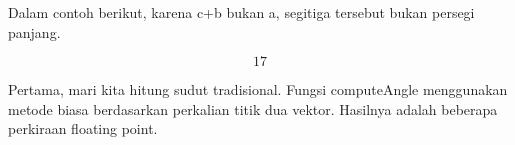 \documentclass[a4paper,10pt]{article}
\begin{document}
\begin{eulernotebook}
\begin{eulercomment}
\begin{eulercomment}
\begin{eulercomment}
\begin{eulercomment}
\begin{eulercomment}
\begin{eulercomment}
\begin{eulercomment}
\begin{eulercomment}
\begin{eulercomment}
\begin{eulercomment}
\begin{eulercomment}
\begin{eulercomment}
\begin{eulercomment}
\begin{eulercomment}
\begin{eulercomment}
\begin{eulercomment}
\begin{eulercomment}
\begin{eulercomment}
\begin{eulercomment}
Dalam contoh berikut, karena c+b bukan a, segitiga tersebut bukan
persegi panjang.
\end{eulercomment}
\begin{eulerformula}
\[
17
\]
\end{eulerformula}
\begin{eulercomment}
Pertama, mari kita hitung sudut tradisional. Fungsi computeAngle
menggunakan metode biasa berdasarkan perkalian titik dua vektor.
Hasilnya adalah beberapa perkiraan floating point.


\end{eulercomment}
\end{eulercomment}
\end{eulercomment}
\end{eulercomment}
\end{eulercomment}
\end{eulercomment}
\end{eulercomment}
\end{eulercomment}
\end{eulercomment}
\end{eulercomment}
\end{eulercomment}
\end{eulercomment}
\end{eulercomment}
\end{eulercomment}
\end{eulercomment}
\end{eulercomment}
\end{eulercomment}
\end{eulercomment}
\end{eulercomment}
\end{eulernotebook}
\end{document}
